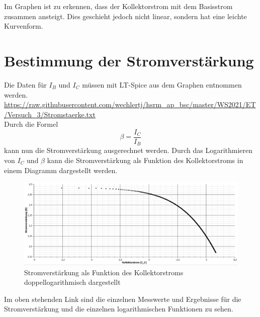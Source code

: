         Im Graphen ist zu erkennen, dass der Kollektorstrom mit dem Basisstrom zusammen ansteigt. Dies geschieht jedoch nicht linear, sondern hat eine leichte Kurvenform.

    \section{Bestimmung der Stromverstärkung}
        Die Daten für \(I_B\) und \(I_C\) müssen mit LT-Spice aus dem Graphen entnommen werden.\\
        \url{https://raw.githubusercontent.com/wechlertj/hsrm_ap_bsc/master/WS2021/ET/Versuch_3/Stromstaerke.txt}\\
        Durch die Formel
        \begin{equation}
            \beta=\frac{I_C}{I_B}
        \end{equation}
        kann nun die Stromverstärkung ausgerechnet werden. Durch das Logarithmieren von \(I_C\) und \(\beta\) kann die Stromverstärkung als Funktion des Kollektorstroms in einem Diagramm dargestellt werden.

        \begin{figure}[!ht]
            \centering
            \includegraphics[width=\linewidth]{Bilder/24graph.PNG}
            \caption{Stromverstärkung als Funktion des Kollektorstroms doppellogarithmisch dargestellt}
            \label{fig:241}
        \end{figure}

        Im oben stehenden Link sind die einzelnen Messwerte und Ergebnisse für die Stromverstärkung und die einzelnen logarithmischen Funktionen zu sehen.

